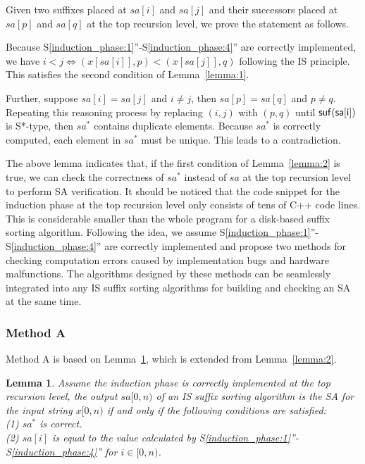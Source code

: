 \documentclass[10pt,journal,compsoc]{IEEEtran}
\newtheorem{lemma}[theorem]{Lemma}
\begin{document}
\begin{IEEEproof} Given two suffixes placed at $sa[i]$ and $sa[j]$ and their successors placed at $sa[p]$ and $sa[q]$ at the top recursion level, we prove the statement as follows.

Because S\ref{induction_phase:1}''-S\ref{induction_phase:4}'' are correctly implemented, we have $i < j \iff (x[sa[i]], p) < (x[sa[j]], q)$ following the IS principle. This satisfies the second condition of Lemma~\ref{lemma:1}.

Further, suppose $sa[i] = sa[j]$ and $i \ne j$, then $sa[p] = sa[q]$ and $p \ne q$. Repeating this reasoning process by replacing $(i, j)$ with $(p, q)$ until $\sf suf(sa[i])$ is S*-type, then $sa^*$ contains duplicate elements. Because $sa^*$ is correctly computed, each element in $sa^*$ must be unique. This leads to a contradiction.
\end{IEEEproof}

The above lemma indicates that, if the first condition of Lemma~\ref{lemma:2} is true, we can check the correctness of $sa^*$ instead of $sa$ at the top recursion level to perform SA verification. It should be noticed that the code snippet for the induction phase at the top recursion level only consists of tens of C++ code lines. This is considerable smaller than the whole program for a disk-based suffix sorting algorithm. Following the idea, we assume S\ref{induction_phase:1}''-S\ref{induction_phase:4}'' are correctly implemented and propose two methods for checking computation errors caused by implementation bugs and hardware malfunctions. The algorithms designed by these methods can be seamlessly integrated into any IS suffix sorting algorithms for building and checking an SA at the same time.

\subsubsection{Method A} \label{sec:proposals:method_a}

Method A is based on Lemma~\ref{lemma:3}, which is extended from Lemma~\ref{lemma:2}.

\begin{lemma} \label{lemma:3}
	Assume the induction phase is correctly implemented at the top recursion level, the output $sa[0, n)$ of an IS suffix sorting algorithm is the SA for the input string $x[0, n)$ if and only if the following conditions are satisfied: \\
	(1) $sa^*$ is correct. \\
	(2) $sa[i]$ is equal to the value calculated by S\ref{induction_phase:1}''-S\ref{induction_phase:4}'' for $i \in [0, n)$. \\
	
\end{lemma}
\end{document}
